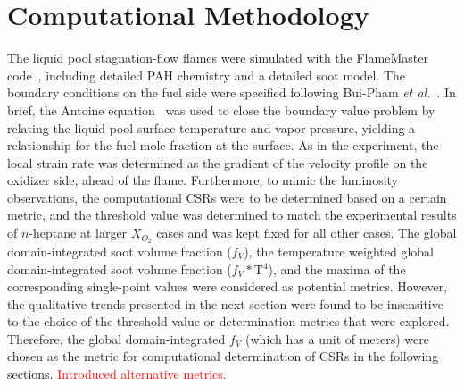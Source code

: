 \documentclass[review,3p,times]{elsarticleUS}
\begin{document}
\section{Computational Methodology}

The liquid pool stagnation-flow flames were simulated with the FlameMaster code~\cite{flamemaster}, including detailed PAH chemistry and a detailed soot model. The boundary conditions on the fuel side were specified following Bui-Pham \emph{et al.}~\cite{buipham91}. In brief, the Antoine equation~\cite{polingbook} was used to close the boundary value problem by relating the liquid pool surface temperature and vapor pressure, yielding a relationship for the fuel mole fraction at the surface. As in the experiment, the local strain rate was determined as the gradient of the velocity profile on the oxidizer side, ahead of the flame. Furthermore, to mimic the luminosity observations, the computational CSRs were to be determined based on a certain metric, and the threshold value was determined to match the experimental results of $n$-heptane at larger $X_{O_2}$ cases and was kept fixed for all other cases.  The global domain-integrated soot volume fraction ($f_V$), the temperature weighted global domain-integrated soot volume fraction ($f_V*$T$^4$), and the maxima of the corresponding single-point values were considered as potential metrics.  However, the qualitative trends presented in the next section were found to be insensitive to the choice of the threshold value or determination metrics that were explored.  Therefore, the global domain-integrated $f_V$ (which has a unit of meters) were chosen as the metric for computational determination of CSRs in the following sections. \textcolor{red}{Introduced alternative metrics.}
\end{document}
